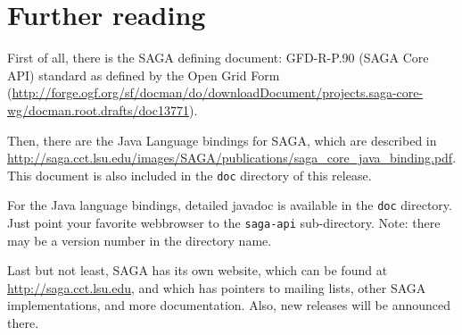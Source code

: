 \documentclass[a4paper,10pt]{article}
\begin{document}
\section{Further reading}

First of all, there is the SAGA defining document:
GFD-R-P.90 (SAGA Core API) standard as defined by the
Open Grid Form (\url{http://forge.ogf.org/sf/docman/do/downloadDocument/projects.saga-core-wg/docman.root.drafts/doc13771}).

Then, there are the Java Language bindings for SAGA, which
are described in \url{http://saga.cct.lsu.edu/images/SAGA/publications/saga_core_java_binding.pdf}. This document is also included in the
\texttt{doc} directory of this release.

For the Java language bindings, detailed javadoc is available
in the \texttt{doc} directory. Just point your favorite webbrowser
to the \texttt{saga-api} sub-directory. Note: there may be a version
number in the directory name.

Last but not least, SAGA has its own website,
which can be found at \url{http://saga.cct.lsu.edu},
and which has pointers to mailing lists, other SAGA implementations,
and more documentation. Also, new releases will be announced there.
\end{document}
